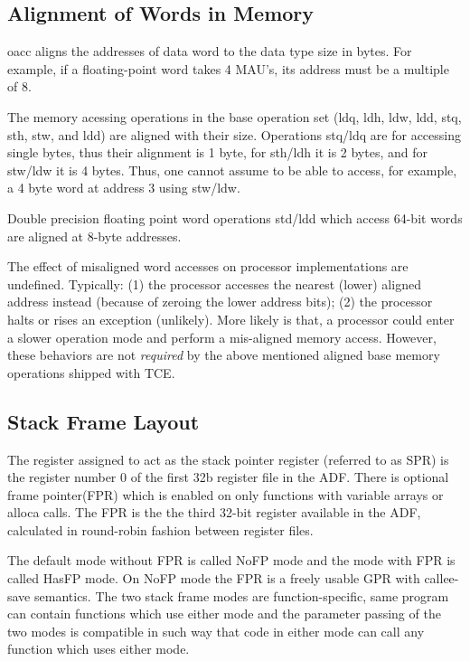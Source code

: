 \documentclass[a4paper,twoside]{tceusermanual}
\begin{document}
\subsection{Alignment of Words in Memory}
\label{ssec:align-conventions}

oacc aligns the addresses of data word to the data type size in bytes.
For example, if a floating-point word takes 4 MAU's, its address must be 
a multiple of 8. 

The memory acessing operations in the base operation set (ldq, ldh, ldw,
ldd, stq, sth, stw, and ldd) are aligned with their size. Operations stq/ldq
are for accessing single bytes, thus their alignment is 1 byte, 
for sth/ldh it is 2 bytes, and for stw/ldw it is 4 bytes. Thus, one cannot 
assume to be able to access, for example, a 4 byte word at address 3
using stw/ldw.

Double precision floating point word operations std/ldd which access
64-bit words are aligned at 8-byte addresses. 

The effect of misaligned word accesses on processor implementations are
undefined. Typically: (1) the processor accesses the nearest (lower) aligned
address instead (because of zeroing the lower address bits); (2) the processor 
halts or rises an exception (unlikely). More likely is that, a processor 
could enter a slower operation mode and perform a mis-aligned memory access.
However, these behaviors are not \textit{required} by the above mentioned 
aligned base memory operations shipped with TCE.

\subsection{Stack Frame Layout}
\label{sec:stack-layout}

The register assigned to act as the stack pointer register (referred to as 
SPR) is the register number 0 of the first 32b register file in the ADF. 
There is optional frame pointer(FPR) which is enabled on only functions with
variable arrays or alloca calls. The FPR is the the third 32-bit register
available in the ADF, calculated in round-robin fashion between register files.

The default mode without FPR is called NoFP mode and the mode with FPR is
called HasFP mode. On NoFP mode the FPR is a freely usable GPR with
callee-save semantics.
The two stack frame modes are function-specific, same program can contain
functions which use either mode and the parameter passing of the two modes
is compatible in such way that code in either mode can call any function
which uses either mode.
\end{document}
